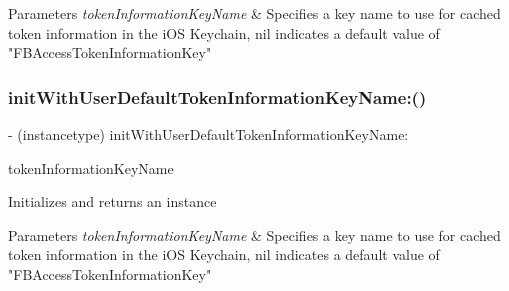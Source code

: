 \begin{DoxyParams}{Parameters}
{\em token\+Information\+Key\+Name} & Specifies a key name to use for cached token information in the i\+OS Keychain, nil indicates a default value of "F\+B\+Access\+Token\+Information\+Key" \\
\hline
\end{DoxyParams}
\mbox{\label{interfaceFBSessionTokenCachingStrategy_a450317ada46fcbed38bf0edf0d0cede9}} 
\subsubsection{\texorpdfstring{init\+With\+User\+Default\+Token\+Information\+Key\+Name\+:()}{initWithUserDefaultTokenInformationKeyName:()}\hspace{0.1cm}{\footnotesize\ttfamily [5/5]}}
{\footnotesize\ttfamily -\/ (instancetype) init\+With\+User\+Default\+Token\+Information\+Key\+Name\+: \begin{DoxyParamCaption}\item[{(N\+S\+String $\ast$)}]{token\+Information\+Key\+Name }\end{DoxyParamCaption}}

Initializes and returns an instance


\begin{DoxyParams}{Parameters}
{\em token\+Information\+Key\+Name} & Specifies a key name to use for cached token information in the i\+OS Keychain, nil indicates a default value of "F\+B\+Access\+Token\+Information\+Key" \\
\hline
\end{DoxyParams}
\mbox{\label{interfaceFBSessionTokenCachingStrategy_a3974571bceb0745f400bf2a6674a963f}} 

